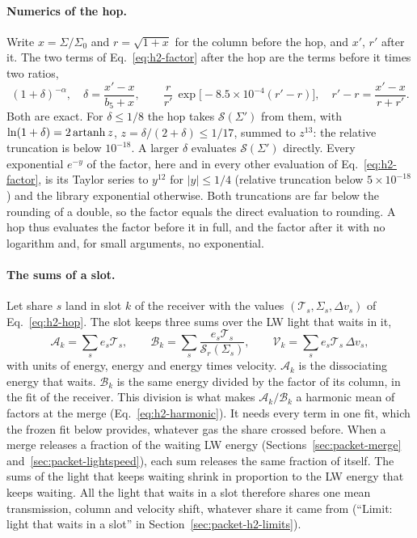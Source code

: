 \paragraph{Numerics of the hop.} Write $x=\Sigma/\Sigma_0$ and $r=\sqrt{1+x}$
for the column before the hop, and $x'$, $r'$ after it. The two terms of
Eq.~\eqref{eq:h2-factor} after the hop are the terms before it times two
ratios,
\begin{equation}
  (1+\delta)^{-\alpha}, \quad \delta=\frac{x'-x}{b_5+x}, \qquad
  \frac{r}{r'}\,\exp\!\big[-8.5\times10^{-4}(r'-r)\big], \quad
  r'-r=\frac{x'-x}{r+r'}.
  \label{eq:h2-hop-ratios}
\end{equation}
Both are exact. For $\delta\le1/8$ the hop takes $\mathcal S(\Sigma')$ from
them, with $\ln(1+\delta)=2\,{\rm artanh}\,z$, $z=\delta/(2+\delta)\le1/17$,
summed to $z^{13}$: the relative truncation is below $10^{-18}$. A larger
$\delta$ evaluates $\mathcal S(\Sigma')$ directly. Every exponential
$e^{-y}$ of the factor, here and in every other evaluation of
Eq.~\eqref{eq:h2-factor}, is its Taylor series to $y^{12}$ for
$|y|\le1/4$ (relative truncation below $5\times10^{-18}$) and the library
exponential otherwise. Both truncations are far below the rounding of a
double, so the factor equals the direct evaluation to rounding. A hop thus
evaluates the factor before it in full, and the factor after it with no
logarithm and, for small arguments, no exponential.

\paragraph{The sums of a slot.} Let share $s$ land in slot $k$ of the receiver
with the values $(\mathcal T_s,\Sigma_s,\Delta v_s)$ of Eq.~\eqref{eq:h2-hop}.
The slot keeps three sums over the LW light that waits in it,
\begin{equation}
  \mathcal A_k=\sum_s e_s\mathcal T_s, \qquad
  \mathcal B_k=\sum_s \frac{e_s\mathcal T_s}{\mathcal S_r(\Sigma_s)}, \qquad
  \mathcal V_k=\sum_s e_s\mathcal T_s\,\Delta v_s,
  \label{eq:h2-sums}
\end{equation}
with units of energy, energy and energy times velocity. $\mathcal A_k$ is the
dissociating energy that waits. $\mathcal B_k$ is the same energy divided by
the factor of its column, in the fit of the receiver. This division is what
makes $\mathcal A_k/\mathcal B_k$ a harmonic mean of factors at the merge
(Eq.~\eqref{eq:h2-harmonic}). It needs every term in one fit, which the frozen
fit below provides, whatever gas the share crossed before. When a merge
releases a fraction of the waiting LW energy (Sections~\ref{sec:packet-merge}
and~\ref{sec:packet-lightspeed}), each sum releases the same fraction of
itself. The sums of the light that keeps waiting shrink in proportion to the
LW energy that keeps waiting. All the light that waits in a slot therefore
shares one mean transmission, column and velocity shift, whatever share it
came from (``Limit: light that waits in a slot'' in
Section~\ref{sec:packet-h2-limits}).

